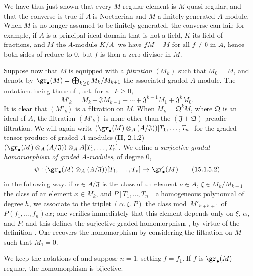 We have thus just shown that every $M$-regular element is $M$-quasi-regular, and that the converse is true if $A$ is Noetherian and $M$ a finitely generated $A$-module.
When $M$ is no longer assumed to be finitely generated, the converse can fail:
for example, if $A$ is a principal ideal domain that is not a field, $K$ its field of fractions, and $M$ the $A$-module $K/A$, we have $fM=M$ for all $f\neq 0$ in $A$, hence both sides of  reduce to $0$, but $f$ is then a zero divisor in $M$.

\begin{env}[15.1.5]
\label{0.15.1.5}
Suppose now that $M$ is equipped with a \emph{filtration} $(M_k)$ such that $M_0=M$, and denote by $\gr_\bullet(M)=\bigoplus_{k\geq 0}M_k/M_{k+1}$ the associated graded $A$-module.
The notations being those of , set, for all $k\geq 0$,
\[
\label{0.15.1.5.1}
  M'_k = M_k + \mathfrak{J}M_{k-1} + \cdots + \mathfrak{J}^{k-1}M_1 + \mathfrak{J}^k M_0.
\tag{15.1.5.1}
\]
It is clear that $(M'_k)$ is a filtration on $M$.
When $M_k=\mathfrak{Q}^k M$, where $\mathfrak{Q}$ is an ideal of $A$, the filtration $(M'_k)$ is none other than the $(\mathfrak{J}+\mathfrak{Q})$-preadic filtration.
We will again write $(\gr_\bullet(M)\otimes_A(A/\mathfrak{J}))[T_1,\ldots,T_n]$ for the graded tensor product of graded $A$-modules ($\mathbf{II}$, 2.1.2)
$(\gr_\bullet(M)\otimes_A(A/\mathfrak{J}))\otimes_A A[T_1,\ldots,T_n]$.
We define a \emph{surjective graded homomorphism of graded $A$-modules}, of degree $0$,
\[
\label{0.15.1.5.2}
  \psi : (\gr_\bullet(M)\otimes_A(A/\mathfrak{J}))[T_1,\ldots,T_n] \to \gr'_\bullet(M)
\tag{15.1.5.2}
\]
in the following way:
if $\alpha\in A/\mathfrak{J}$ is the class of an element $a\in A$, $\xi\in M_k/M_{k+1}$ the class of an element $x\in M_k$, and $P[T_1,\ldots,T_n]$ a homogeneous polynomial of degree $h$, we associate to the triplet $(\alpha,\xi,P)$ the class mod~$M'_{k+h+1}$ of $P(f_1,\ldots,f_n)ax$;
one verifies immediately that this element depends only on $\xi$, $\alpha$, and $P$, and this defines the surjective graded homomorphism , by virtue of the definition .
One recovers the homomorphism  by considering the filtration on $M$ such that $M_1=0$.
\end{env}

\begin{lemma}[15.1.6]
\label{0.15.1.6}
We keep the notations of  and suppose $n=1$, setting $f=f_1$.
If $f$ is $\gr_\bullet(M)$-regular, the homomorphism  is bijective.
\end{lemma}

